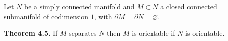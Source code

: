 Let $N$ be a simply connected manifold and $M \subset N$ a closed connected submanifold of codimension $1$, with $\partial M = \partial N = \varnothing$.

\textbf{Theorem 4.5.} If $M$ separates $N$ then $M$ is orientable if $N$ is orientable.
